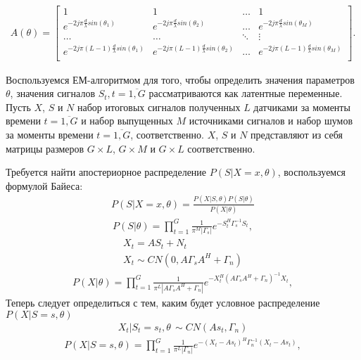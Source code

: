 \documentclass[11pt]{article}
\begin{document}
\begin{itemize}
\begin{gather}
A(\theta) = \begin{bmatrix}
1&1&\dots&1\\
e^{-2j\pi \frac{d}{\lambda}sin(\theta_1)}& e^{-2j\pi \frac{d}{\lambda}sin(\theta_2)}&\dots&e^{-2j\pi \frac{d}{\lambda}sin(\theta_M)}\\
\dots&\dots&\ddots&\vdots\\
e^{-2j\pi (L-1) \frac{d}{\lambda}sin(\theta_1)}& e^{-2j\pi (L-1) \frac{d}{\lambda}sin(\theta_2)}&\dots&e^{-2j\pi (L-1) \frac{d}{\lambda}sin(\theta_M)}\\
\end{bmatrix}.
\nonumber
\end{gather}
\end{itemize}
Воспользуемся ЕМ-алгоритмом для того, чтобы определить значения параметров $\theta$, значения сигналов $S_t, t=\overline{1,G}$ рассматриваются как латентные переменные. 
Пусть $X$, $S$ и $N$ набор итоговых сигналов полученных $L$ датчиками за моменты времени $t=\overline{1,G}$ и набор выпущенных $M$ источниками сигналов и набор шумов за моменты времени $t=\overline{1,G}$, соответственно. $X$, $S$ и $N$ представляют из себя матрицы размеров $G \times L$, $G \times M$ и $G \times L$ соответственно.
\begin{center}
\fontsize{16}{20}\selectfont {}
\end{center}
Требуется найти апостериорное распределение $P(S|X=x,\theta)$, воспользуемся формулой Байеса:
\begin{gather}
P(S|X=x,\theta) = \frac{P(X|S,\theta)P(S|\theta)}{P(X|\theta)}
\end{gather}
\begin{gather}
P(S|\theta) = \prod_{t=1}^G \frac{1}{\pi^M |\Gamma_s|}e^{-S_t^H\Gamma_s^{-1}S_t},
\end{gather}
\begin{gather*}
X_t = AS_t + N_t \\
X_t \sim CN(0, A\Gamma_s A^H + \Gamma_n)
\end{gather*}
\begin{gather}
P(X|\theta) = \prod_{t=1}^G \frac{1}{\pi^L |A\Gamma_s  A^H + \Gamma_n|}e^{-X_t^H (A\Gamma_s A^H + \Gamma_n)^{-1}X_t},
\end{gather}
Теперь следует определиться с тем, каким будет условное распределение $P(X|S=s, \theta)$
\begin{gather*}
X_t|S_t=s_t, \theta \, \sim CN(A s_t, \Gamma_n)
\end{gather*}
\begin{gather}
P(X|S=s,\theta) = \prod_{t=1}^G \frac{1}{\pi^L |\Gamma_n|}e^{-(X_t-A s_t)^H \Gamma_n^{-1}(X_t-A s_t)},
\end{gather}
\end{document}
